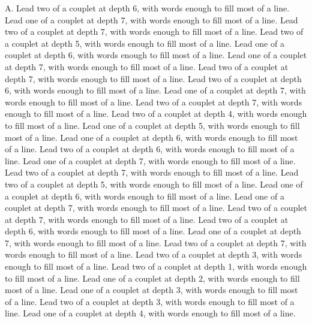 \documentclass[a4paper]{article}
\begin{document}
\begin{Key}{A. }
\alter Lead two of a couplet at depth 6, with words enough to fill most of a line.
\alter Lead one of a couplet at depth 7, with words enough to fill most of a line.
\alter Lead two of a couplet at depth 7, with words enough to fill most of a line.
\alter Lead two of a couplet at depth 5, with words enough to fill most of a line.
\alter Lead one of a couplet at depth 6, with words enough to fill most of a line.
\alter Lead one of a couplet at depth 7, with words enough to fill most of a line.
\alter Lead two of a couplet at depth 7, with words enough to fill most of a line.
\alter Lead two of a couplet at depth 6, with words enough to fill most of a line.
\alter Lead one of a couplet at depth 7, with words enough to fill most of a line.
\alter Lead two of a couplet at depth 7, with words enough to fill most of a line.
\alter Lead two of a couplet at depth 4, with words enough to fill most of a line.
\alter Lead one of a couplet at depth 5, with words enough to fill most of a line.
\alter Lead one of a couplet at depth 6, with words enough to fill most of a line.
\alter Lead two of a couplet at depth 6, with words enough to fill most of a line.
\alter Lead one of a couplet at depth 7, with words enough to fill most of a line.
\alter Lead two of a couplet at depth 7, with words enough to fill most of a line.
\alter Lead two of a couplet at depth 5, with words enough to fill most of a line.
\alter Lead one of a couplet at depth 6, with words enough to fill most of a line.
\alter Lead one of a couplet at depth 7, with words enough to fill most of a line.
\alter Lead two of a couplet at depth 7, with words enough to fill most of a line.
\alter Lead two of a couplet at depth 6, with words enough to fill most of a line.
\alter Lead one of a couplet at depth 7, with words enough to fill most of a line.
\alter Lead two of a couplet at depth 7, with words enough to fill most of a line.
\alter Lead two of a couplet at depth 3, with words enough to fill most of a line.
\alter Lead two of a couplet at depth 1, with words enough to fill most of a line.
\alter Lead one of a couplet at depth 2, with words enough to fill most of a line.
\alter Lead one of a couplet at depth 3, with words enough to fill most of a line.
\alter Lead two of a couplet at depth 3, with words enough to fill most of a line.
\alter Lead one of a couplet at depth 4, with words enough to fill most of a line.

\end{Key}
\end{document}
